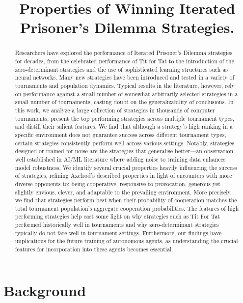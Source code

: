 \documentclass{article}
\title{Properties of Winning Iterated Prisoner's Dilemma Strategies.}
\author{}
\date{}
\newcommand{\numberofstrategies}{}
\begin{document}
\maketitle

\begin{abstract}
Researchers have explored the performance of Iterated Prisoner's Dilemma strategies
for decades, from the celebrated performance of Tit for Tat to the
introduction of the zero-determinant strategies and the use of sophisticated learning
structures such as neural networks. Many new strategies have been introduced and tested
in a variety of tournaments and population dynamics. Typical results in the literature,
however, rely on performance against a small number of somewhat arbitrarily selected
strategies in a small number of tournaments, casting doubt on the generalizability
of conclusions. In this work, we analyze a large collection of \numberofstrategies
strategies in thousands of computer tournaments, present the top performing strategies across multiple
tournament types, and distill their salient features. 
We find that although a strategy's high ranking in a specific environment
does not guarantee success across different tournament types, certain strategies
consistently perform well across various settings. Notably,
strategies designed or trained for noise are the strategies that generalise
better—an observation well established in AI/ML literature where adding noise to
training data enhances model robustness.
We identify several crucial properties
heavily influencing the success of strategies, refining Axelrod's described
properties in light of encounters with more diverse opponents to: being
cooperative, responsive to provocation, generous yet slightly envious, clever,
and adaptable to the prevailing environment. More precisely,
we find that strategies perform best when their probability of cooperation
matches the total tournament population's aggregate cooperation probabilities.
The features of high performing strategies help cast some light on why
strategies such as Tit For Tat performed historically well in tournaments and
why zero-determinant strategies typically do not fare well in tournament
settings. Furthermore, our findings have implications for the future training of
autonomous agents, as understanding the crucial features for incorporation into
these agents becomes essential.
\end{abstract}

\section{Background}
\end{document}

